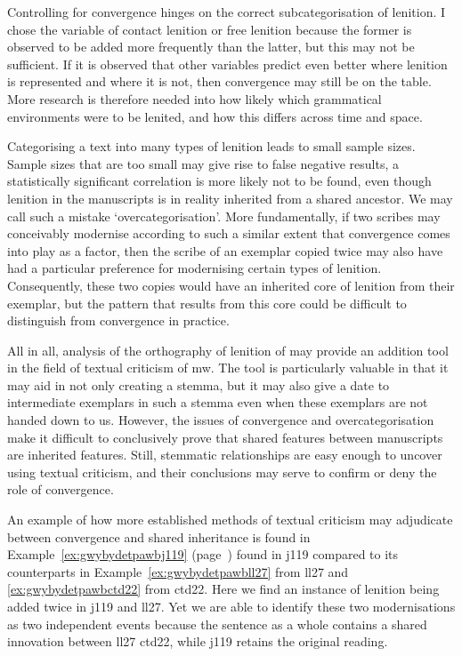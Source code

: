 Controlling for convergence hinges on the correct subcategorisation of lenition. I chose the variable of contact lenition or free lenition because the former is observed to be added more frequently than the latter, but this may not be sufficient. If it is observed that other variables predict even better where lenition is represented and where it is not, then convergence may still be on the table. More research is therefore needed into how likely which grammatical environments were to be lenited, and how this differs across time and space.

Categorising a text into many types of lenition leads to small sample sizes. Sample sizes that are too small may give rise to false negative results, \ie a statistically significant correlation is more likely not to be found, even though lenition in the manuscripts is in reality inherited from a shared ancestor. We may call such a mistake `overcategorisation'. More fundamentally, if two scribes may conceivably modernise according to such a similar extent that convergence comes into play as a factor, then the scribe of an exemplar copied twice may also have had a particular preference for modernising certain types of lenition. Consequently, these two copies would have an inherited core of lenition from their exemplar, but the pattern that results from this core could be difficult to distinguish from convergence in practice.

All in all, analysis of the orthography of lenition of  may provide an addition tool in the field of textual criticism of \gls{mw}. The tool is particularly valuable in that it may aid in not only creating a stemma, but it may also give a date to intermediate exemplars in such a stemma even when these exemplars are not handed down to us. However, the issues of convergence and overcategorisation make it difficult to conclusively prove that shared features between manuscripts are inherited features. Still, stemmatic relationships are easy enough to uncover using textual criticism, and their conclusions may serve to confirm or deny the role of convergence.

An example of how more established methods of textual criticism may adjudicate between convergence and shared inheritance is  found in Example~\ref{ex:gwybydetpawbj119} (page~\pageref{ex:gwybydetpawbj119}) found in \gls{j119} compared to its counterparts in Example~\ref{ex:gwybydetpawbll27} from \gls{ll27} and \ref{ex:gwybydetpawbctd22} from \gls{ctd22}. Here we find an instance of lenition being added twice in \gls{j119} and \gls{ll27}. Yet we are able to identify these two modernisations as two independent events  because the sentence as a whole contains a shared innovation between \gls{ll27} \gls{ctd22}, while \gls{j119} retains the original reading. 

